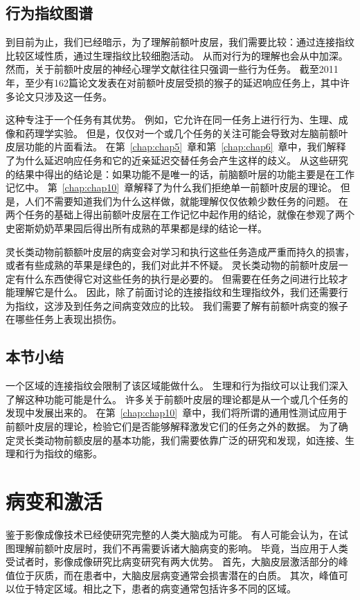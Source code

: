 \subsection{行为指纹图谱}

到目前为止，我们已经暗示，为了理解前额叶皮层，我们需要比较：通过连接指纹比较区域性质，通过生理指纹比较细胞活动。
从而对行为的理解也会从中加深。
然而，关于前额叶皮层的神经心理学文献往往只强调一些行为任务。
截至2011年，至少有162篇论文发表在对前额叶皮层受损的猴子的延迟响应任务上，其中许多论文只涉及这一任务。


\par
这种专注于一个任务有其优势。
例如，它允许在同一任务上进行行为、生理、成像和药理学实验。
但是，仅仅对一个或几个任务的关注可能会导致对左脑前额叶皮层功能的片面看法。
在第~\ref{chap:chap5}~章和第~\ref{chap:chap6}~章中，我们解释了为什么延迟响应任务和它的近亲延迟交替任务会产生这样的歧义。
从这些研究的结果中得出的结论是：如果功能不是唯一的话，前脑额叶层的功能主要是在工作记忆中。
第~\ref{chap:chap10}~章解释了为什么我们拒绝单一前额叶皮层的理论。
但是，人们不需要知道我们为什么这样做，就能理解仅仅依赖少数任务的问题。
在两个任务的基础上得出前额叶皮层在工作记忆中起作用的结论，就像在参观了两个史密斯奶奶苹果园后得出所有成熟的苹果都是绿的结论一样。
\par
灵长类动物前额额叶皮层的病变会对学习和执行这些任务造成严重而持久的损害，或者有些成熟的苹果是绿色的，我们对此并不怀疑。
灵长类动物的前额叶皮层一定有什么东西使得它对这些任务的执行是必要的。
但需要在任务之间进行比较才能理解它是什么。
因此，除了前面讨论的连接指纹和生理指纹外，我们还需要行为指纹，这涉及到任务之间病变效应的比较。
我们需要了解有前额叶病变的猴子在哪些任务上表现出损伤。


\subsection{本节小结}

一个区域的连接指纹会限制了该区域能做什么。
生理和行为指纹可以让我们深入了解这种功能可能是什么。
许多关于前额叶皮层的理论都是从一个或几个任务的发现中发展出来的。
在第~\ref{chap:chap10}~章中，我们将所谓的通用性测试应用于前额叶皮层的理论，检验它们是否能够解释激发它们的任务之外的数据。
为了确定灵长类动物前额皮层的基本功能，我们需要依靠广泛的研究和发现，如连接、生理和行为指纹的缩影。


\section{病变和激活}

鉴于影像成像技术已经使研究完整的人类大脑成为可能。
有人可能会认为，在试图理解前额叶皮层时，我们不再需要诉诸大脑病变的影响。
毕竟，当应用于人类受试者时，影像成像研究比病变研究有两大优势。
首先，大脑皮层激活部分的峰值位于灰质，而在患者中，大脑皮层病变通常会损害潜在的白质。
其次，峰值可以位于特定区域。相比之下，患者的病变通常包括许多不同的区域。


